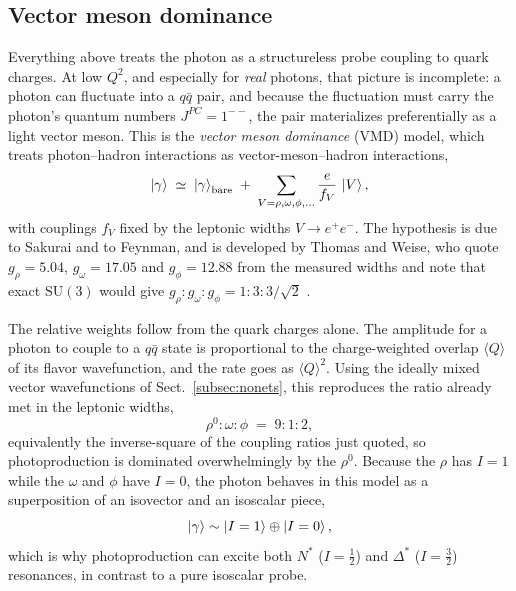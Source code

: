 \FloatBarrier
\subsection{Vector meson dominance}
\label{subsec:vmd}

Everything above treats the photon as a structureless probe coupling to quark charges.
At low $Q^{2}$, and especially for \emph{real} photons, that picture is incomplete: a
photon can fluctuate into a $q\bar q$ pair, and because the fluctuation must carry the
photon's quantum numbers $J^{PC}=1^{--}$, the pair materializes preferentially as a light
vector meson. This is the \emph{vector meson dominance} (VMD) model, which treats
photon--hadron interactions as vector-meson--hadron interactions,
\begin{equation}
    \ket{\gamma} \;\simeq\; \ket{\gamma}_{\text{bare}}
    \;+\; \sum_{V=\rho,\omega,\phi,\dots} \frac{e}{f_{V}}\,\ket{V},
    \label{eq:vmd-expansion}
\end{equation}
with couplings $f_{V}$ fixed by the leptonic widths $V\to e^{+}e^{-}$. The hypothesis is
due to Sakurai and to Feynman, and is developed by Thomas and Weise, who quote
$g_\rho = 5.04$, $g_\omega = 17.05$ and $g_\phi = 12.88$ from the measured widths and note
that exact $\mathrm{SU}(3)$ would give
$g_\rho : g_\omega : g_\phi = 1 : 3 : 3/\sqrt{2}$ \cite[Ch.~2.2]{ThomasWeise2001}.

The relative weights follow from the quark charges alone. The amplitude for a photon to
couple to a $q\bar q$ state is proportional to the charge-weighted overlap
$\langle Q \rangle$ of its flavor wavefunction, and the rate goes as
$\langle Q\rangle^{2}$. Using the ideally mixed vector wavefunctions of
Sect.~\ref{subsec:nonets}, this reproduces the ratio already met in the leptonic widths,
\begin{equation}
    \rho^{0} : \omega : \phi \;=\; 9 : 1 : 2 ,
    \label{eq:vmd-ratios}
\end{equation}
equivalently the inverse-square of the coupling ratios just quoted, so photoproduction is
dominated overwhelmingly by the $\rho^{0}$. Because the $\rho$ has
$I=1$ while the $\omega$ and $\phi$ have $I=0$, the photon behaves in this model as a
superposition of an isovector and an isoscalar piece,
\begin{equation}
    \ket{\gamma} \sim \ket{I=1} \oplus \ket{I=0},
    \label{eq:photon-isospin}
\end{equation}
which is why photoproduction can excite both $N^{*}$ ($I=\tfrac12$) and $\Delta^{*}$
($I=\tfrac32$) resonances, in contrast to a pure isoscalar probe.

